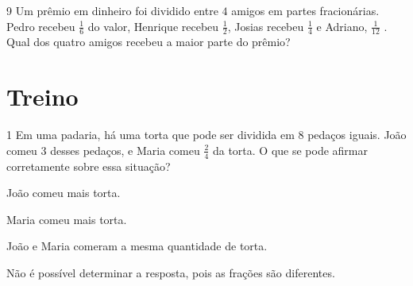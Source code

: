 \begin{escolha}
\item {}
\item {}
\item {}
\item {}
\end{escolha}


\num{9} Um prêmio em dinheiro foi dividido entre $4$ amigos em partes
fracionárias. Pedro recebeu $\frac{1}{6}$ do valor, Henrique recebeu $\frac{1}{2}$, Josias
recebeu $\frac{1}{4}$ e Adriano, $\frac{1}{12}$ . Qual dos quatro amigos recebeu a maior
parte do prêmio?









\section*{Treino}

\num{1}  Em uma padaria, há uma torta que pode ser dividida em $8$ pedaços
iguais. João comeu $3$ desses pedaços, e Maria comeu $\frac{2}{4}$ da torta.
O que se pode afirmar corretamente sobre essa situação?

\begin{escolha}
\item João comeu mais torta.
\item Maria comeu mais torta.
\item João e Maria comeram a mesma quantidade de torta.
\item Não é possível determinar a resposta, pois as frações são diferentes.
\end{escolha}


